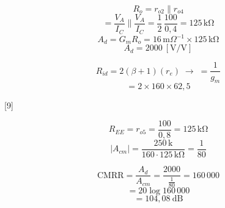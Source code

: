 \documentclass[11pt,a4paper]{article}
\begin{document}
\[ R_o = r_{o2} \parallel r_{o4} \]
\[ = \frac{V_A}{I_C} \parallel \frac{V_A}{I_C} = \frac{1}{2}\,\frac{100}{0{,}4} = 125\,\mathrm{k\Omega} \]
\[ A_d = G_m R_o = 16\,\mathrm{m}\Omega^{-1} \times 125\,\mathrm{k\Omega} \]
\[ A_d = 2000\ [\mathrm{V/V}] \]

\[ R_{id} = 2(\beta+1)(r_e) \;\longrightarrow\; = \frac{1}{g_m} \]
\[ = 2 \times 160 \times 62{,}5 \]

[9]

\[ R_{EE} = r_{o5} = \frac{100}{0{,}8} = 125\,\mathrm{k\Omega} \]
\[ |A_{cm}| = \frac{250\,\mathrm{k}}{160\cdot 125\,\mathrm{k\Omega}} = \frac{1}{80} \]

\[ \mathrm{CMRR} = \frac{A_d}{A_{cm}} = \frac{2000}{\frac{1}{80}} = 160\,000 \]
\[ = 20\log 160\,000 \]
\[ = 104{,}08\ \mathrm{dB} \]
\end{document}
